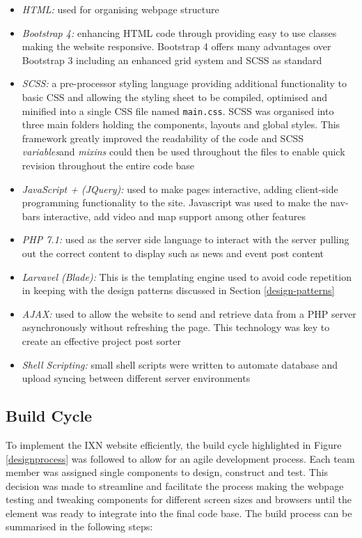 \documentclass[fontsize=11pt]{extarticle}
\numberwithin{figure}{section} %
\numberwithin{table}{section}%
\providecommand{\tightlist}{%
  \setlength{\itemsep}{0pt}\setlength{\parskip}{0pt}}
\begin{document}
\begin{itemize}
\tightlist
\item
  \emph{HTML:} used for organising webpage structure
\item
  \emph{Bootstrap 4:} enhancing HTML code through providing easy to use
  classes making the website responsive. Bootstrap 4 offers many
  advantages over Bootstrap 3 including an enhanced grid system and SCSS
  as standard \cite{Differen19:online}
\item
  \emph{SCSS:} a pre-processor styling language providing additional
  functionality to basic CSS and allowing the styling sheet to be
  compiled, optimised and minified into a single CSS file named
  \texttt{main.css}. SCSS was organised into three main folders holding
  the components, layouts and global styles. This framework greatly
  improved the readability of the code and SCSS \emph{variables}and
  \emph{mixins} could then be used throughout the files to enable quick
  revision throughout the entire code base
\item
  \emph{JavaScript + (JQuery):} used to make pages interactive, adding
  client-side programming functionality to the site. Javascript was used
  to make the nav-bars interactive, add video and map support among
  other features
\item
  \emph{PHP 7.1:} used as the server side language to interact with the
  server pulling out the correct content to display such as news and
  event post content
\item
  \emph{Larvavel (Blade): } This is the templating engine used to avoid
  code repetition in keeping with the design patterns discussed in
  Section \ref{design-patterns}
\item
  \emph{AJAX:} used to allow the website to send and retrieve data from
  a PHP server asynchronously without refreshing the page. This
  technology was key to create an effective project post sorter
\item
  \emph{Shell Scripting: } small shell scripts were written to automate
  database and upload syncing between different server environments
\end{itemize}

\hypertarget{build-cycle}{%
\subsection{Build Cycle}\label{build-cycle}}

To implement the IXN website efficiently, the build cycle highlighted in
Figure \ref{designprocess} was followed to allow for an agile
development process. Each team member was assigned single components to
design, construct and test. This decision was made to streamline and
facilitate the process making the webpage testing and tweaking
components for different screen sizes and browsers until the element was
ready to integrate into the final code base. The build process can be
summarised in the following steps:
\end{document}

